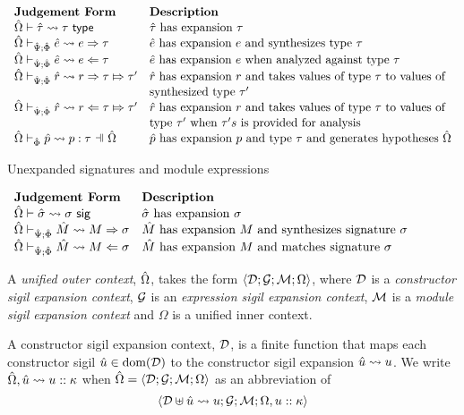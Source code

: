 \vspace{10px}
$\begin{array}{ll}
\textbf{Judgement Form} & \textbf{Description}\\
\tExpandsPX{\utau}{\tau} & \text{$\utau$ has expansion $\tau$}\\
\esynPX{\ue}{e}{\tau} & \text{$\ue$ has expansion $e$ and synthesizes type $\tau$}\\
\eanaPX{\ue}{e}{\tau} & \text{$\ue$ has expansion $e$ when analyzed against type $\tau$}\\
\rsynPX{\urv}{r}{\tau}{\tau'} & \text{$\urv$ has expansion $r$ and takes values of type $\tau$ to values of}\\
& \text{synthesized type $\tau'$}\\
\ranaPX{\urv}{r}{\tau}{\tau'} & \text{$\urv$ has expansion $r$ and takes values of type $\tau$ to values of}\\
& \text{type $\tau'$ when $\tau's$ is provided for analysis}\\
\patExpandsP{\uOmega}{\uPhi}{\upv}{p}{\tau} & \text{$\upv$ has expansion $p$ and type $\tau$ and generates hypotheses $\uOmega$}
\end{array}$
\vspace{10px}

Unexpanded signatures and module expressions

\vspace{10px}
$\begin{array}{ll}
\textbf{Judgement Form} & \textbf{Description}\\
{\hat\Omega} \vdash {\hat\sigma} \leadsto \sigma~\mathsf{sig} & \text{${\hat\sigma}$ has expansion $\sigma$}\\
{\hat\Omega} \vdash_{\hat{\Psi}; \hat\Phi} {\hat M} \leadsto M \Rightarrow \sigma & \text{${\hat M}$ has expansion $M$ and synthesizes signature $\sigma$}\\
{\hat\Omega} \vdash_{\hat{\Psi}; \hat\Phi} {\hat M} \leadsto M \Leftarrow \sigma & \text{${\hat M}$ has expansion $M$ and matches signature $\sigma$}
\end{array}$
\vspace{10px}

A \emph{unified outer context}, ${\hat\Omega}$, takes the form $\langle \mathcal{D}; \mathcal{G}; \mathcal{M}; \Omega \rangle$, where $\mathcal{D}$ is a \emph{constructor sigil expansion context}, $\mathcal{G}$ is an \emph{expression sigil expansion context}, $\mathcal{M}$ is a \emph{module sigil expansion context} and $\Omega$ is a unified inner context.

A constructor sigil expansion context, $\mathcal{D}$, is a finite function that maps each constructor sigil ${\hat u} \in \text{dom}(\mathcal{D})$ to the constructor sigil expansion ${\hat u} \leadsto u$. We write ${\hat\Omega}, {\hat u} \leadsto u :: \kappa$ when ${\hat\Omega}=\langle \mathcal{D}; \mathcal{G}; \mathcal{M}; \Omega \rangle$ as an abbreviation of \[\langle \mathcal{D} \uplus {\hat u} \leadsto u; \mathcal{G}; \mathcal{M}; \Omega, u :: \kappa \rangle\]

